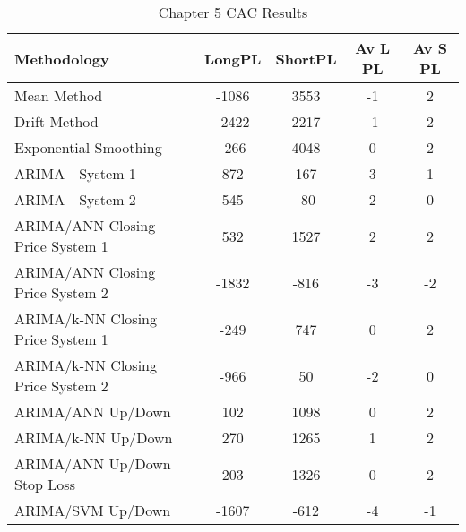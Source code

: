 \begin{table}[ht]
\centering
\caption[Chapter 5 CAC Results]{Chapter 5 CAC Results} 
\label{tab:chp6:cac2_summary}
\begin{tabular}{lcccc}
  \toprule Methodology & LongPL & ShortPL & Av L PL & Av S PL \\ 
  \midrule Mean Method & -1086 & 3553 & -1 & 2 \\ 
  Drift Method & -2422 & 2217 & -1 & 2 \\ 
  Exponential Smoothing & -266 & 4048 & 0 & 2 \\ 
  ARIMA - System 1 & 872 & 167 & 3 & 1 \\ 
  ARIMA - System 2 & 545 & -80 & 2 & 0 \\ 
  ARIMA/ANN Closing Price System 1 & 532 & 1527 & 2 & 2 \\ 
  ARIMA/ANN Closing Price System 2 & -1832 & -816 & -3 & -2 \\ 
  ARIMA/k-NN Closing Price System 1 & -249 & 747 & 0 & 2 \\ 
  ARIMA/k-NN Closing Price System 2 & -966 & 50 & -2 & 0 \\ 
  ARIMA/ANN Up/Down & 102 & 1098 & 0 & 2 \\ 
  ARIMA/k-NN Up/Down & 270 & 1265 & 1 & 2 \\ 
  ARIMA/ANN Up/Down Stop Loss & 203 & 1326 & 0 & 2 \\ 
  ARIMA/SVM Up/Down & -1607 & -612 & -4 & -1 \\ 
   \bottomrule \end{tabular}
\end{table}
